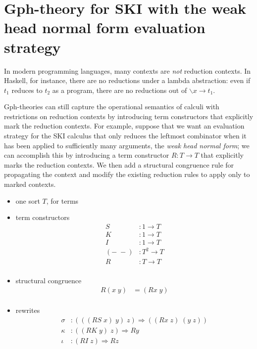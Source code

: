 \documentclass[a4paper,UKenglish]{lipics-v2016}
\newcommand{\maps}{\colon}
\begin{document}
\section{Gph-theory for SKI with the weak head normal form evaluation strategy}
\label{whnf}
In modern programming languages, many contexts are {\em not} reduction contexts.  In Haskell, for instance, there are no reductions under a lambda abstraction: even if $t_1$ reduces to $t_2$ as a program, there are no reductions out of $\backslash x \to t_1$.  

Gph-theories can still capture the operational semantics of calculi with restrictions on reduction contexts by introducing term constructors that explicitly mark the reduction contexts.  For example, suppose that we want an evaluation strategy for the SKI calculus that only reduces the leftmost combinator when it has been applied to sufficiently many arguments, the {\em weak head normal form}; we can accomplish this by introducing a term constructor $R\maps T \to T$ that explicitly marks the reduction contexts.  We then add a structural congruence rule for propagating the context and modify the existing reduction rules to apply only to marked contexts.

\begin{itemize}
  \item one sort $T$, for terms
  \item term constructors
  \[\begin{array}{rl}
    S&:1 \to T\\
    K&:1 \to T\\
    I&:1 \to T\\
    (-\; -)&: T^2 \to T\\
    R&:T \to T\\
  \end{array}\]
  \item structural congruence
  \[\begin{array}{rl}
    R(x\; y) &= (Rx\; y)\\
  \end{array}\]
  \item rewrites
  \[\begin{array}{rl}
    \sigma&:(((RS\; x)\; y)\; z) \Rightarrow ((Rx\; z)\; (y\; z))\\
    \kappa&:((RK\; y)\; z) \Rightarrow Ry\\
    \iota&:(RI\; z) \Rightarrow Rz\\
  \end{array}\]
\end{itemize}
\end{document}
